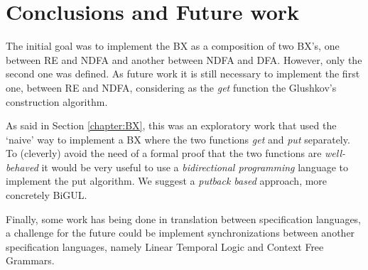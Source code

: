 \section{Conclusions and Future work}
The initial goal was to implement the BX as a composition of two BX's, one between RE and NDFA and another between NDFA and DFA. However, only the second one was defined. As future work it is still necessary to implement the first one, between RE and NDFA, considering as the \textit{get} function the Glushkov's construction algorithm. 

As said in Section \ref{chapter:BX}, this was an exploratory work that used the `naive' way to implement a BX where the two functions \textit{get} and \textit{put} separately. To (cleverly) avoid the need of a formal proof that the two functions are \textit{well-behaved} it would be very useful to use a \textit{bidirectional programming} language to implement the put algorithm. We suggest a \textit{putback based} approach, more concretely BiGUL.

Finally, some work has being done in translation between specification languages, a challenge for the future could be implement synchronizations between another specification languages, namely Linear Temporal Logic and Context Free Grammars.